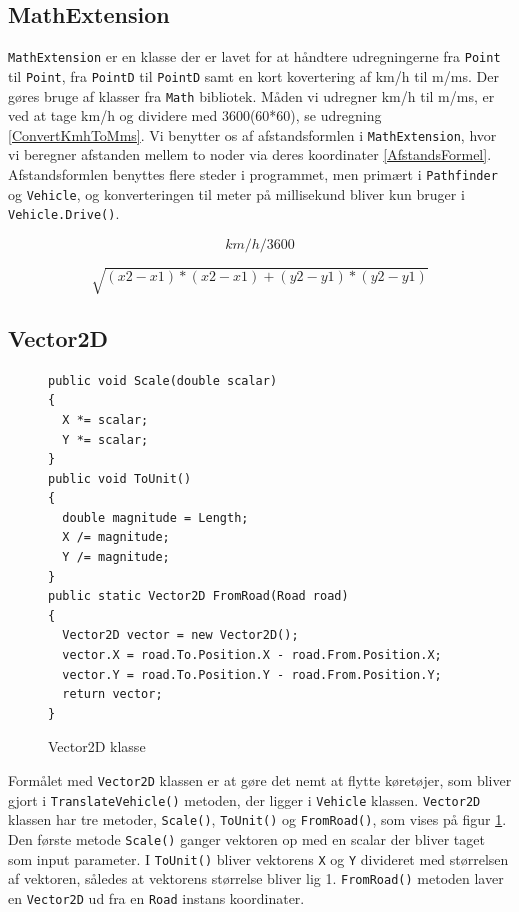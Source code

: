 \subsection*{MathExtension}
\texttt{MathExtension} er en klasse der er lavet for at håndtere udregningerne fra \texttt{Point} til \texttt{Point}, fra \texttt{PointD} til \texttt{PointD} samt en kort kovertering af km/h til m/ms. Der gøres bruge af klasser fra \texttt{Math} bibliotek. Måden vi udregner km/h til m/ms, er ved at tage km/h og dividere med 3600(60*60), se udregning \ref{ConvertKmhToMms}. Vi benytter os af afstandsformlen i \texttt{MathExtension}, hvor vi beregner afstanden mellem to noder via deres koordinater \ref{AfstandsFormel}. Afstandsformlen benyttes flere steder i programmet, men primært i \texttt{Pathfinder} og \texttt{Vehicle}, og konverteringen til meter på millisekund bliver kun bruger i \texttt{Vehicle.Drive()}.

\begin{equation} \label{ConvertKmhToMms}
km/h / 3600
\end{equation}

\begin{equation} \label{AfstandsFormel}
\sqrt{(x2 - x1) * (x2 - x1) + (y2 - y1) * (y2 - y1)}
\end{equation}

\subsection*{Vector2D}
\begin{figure}[H]
\begin{lstlisting}
public void Scale(double scalar)
{
  X *= scalar;
  Y *= scalar;
}
public void ToUnit()
{
  double magnitude = Length;
  X /= magnitude;
  Y /= magnitude;
}
public static Vector2D FromRoad(Road road)
{
  Vector2D vector = new Vector2D();
  vector.X = road.To.Position.X - road.From.Position.X;
  vector.Y = road.To.Position.Y - road.From.Position.Y;
  return vector;
}
\end{lstlisting}
\caption{Vector2D klasse}\label{Vector2D}
\end{figure}

Formålet med \texttt{Vector2D} klassen er at gøre det nemt at flytte køretøjer, som bliver gjort i \texttt{TranslateVehicle()} metoden, der ligger i \texttt{Vehicle} klassen. \texttt{Vector2D} klassen har tre metoder, \texttt{Scale()}, \texttt{ToUnit()} og \texttt{FromRoad()}, som vises på figur \ref{Vector2D}. Den første metode \texttt{Scale()} ganger vektoren op med en scalar der bliver taget som input parameter. I \texttt{ToUnit()} bliver vektorens \texttt{X} og \texttt{Y} divideret med størrelsen af vektoren, således at vektorens størrelse bliver lig 1. \texttt{FromRoad()} metoden laver en \texttt{Vector2D} ud fra en \texttt{Road} instans koordinater.